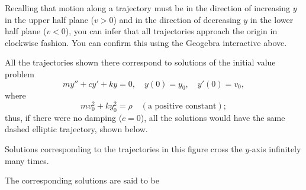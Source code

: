 \documentclass{ximera}
\begin{document}
 
Recalling that
motion along a trajectory must be in the direction of increasing $y$
in the upper half plane ($v>0$) and in the direction of decreasing $y$
in the lower half plane ($v<0$), you can infer that all trajectories
approach the origin in clockwise fashion. You can confirm this using the Geogebra interactive above.

 
 
 
All the trajectories shown there correspond to
solutions of the initial value problem
$$
my''+cy'+ky=0,\quad y(0)=y_0,\quad y'(0)=v_0,
$$
where
$$
mv_0^2+ky_0^2=\rho\quad (\mbox{a positive constant});
$$
thus, if there were no damping ($c=0$),  all the solutions would
have the same dashed elliptic trajectory, shown below.

\begin{center}
\end{center}
 
 
Solutions corresponding to the trajectories in
this figure cross the $y$-axis infinitely many times.



 
 
The corresponding solutions %
are said to be 
 
\begin{center}
\end{center}
 
\end{document}
